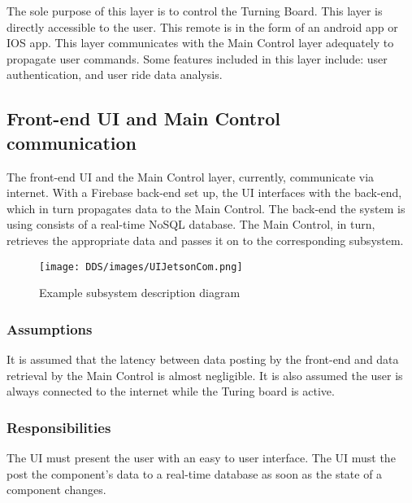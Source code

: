 The sole purpose of this layer is to control the Turning Board. This layer is directly accessible to the user. This remote is in the form of an android app or IOS app. This layer communicates with the Main Control layer adequately to propagate user commands. Some features included in this layer include: user authentication, and user ride data analysis.


\subsection{Front-end UI and Main Control communication }
The front-end UI and the Main Control layer, currently, communicate via internet. With a Firebase back-end set up, the UI interfaces with the back-end, which in turn propagates data to the Main Control. The back-end the system is using consists of a real-time NoSQL database. The Main Control, in turn, retrieves the appropriate data and passes it on to the corresponding subsystem.


\begin{figure}[h!]
	\centering
 	\texttt{[image: DDS/images/UIJetsonCom.png]}
 \caption{Example subsystem description diagram}
\end{figure}

\subsubsection{Assumptions}
It is assumed that the latency between data posting by the front-end and data retrieval by the Main Control is almost negligible. It is also assumed the user is always connected to the internet while the Turing board is active.

\subsubsection{Responsibilities}
The UI must present the user with an easy to user interface. The UI must the post the component's data to a real-time database as soon as the state of a component changes.

